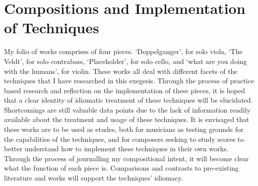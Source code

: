 

\chapter{Compositions and Implementation of Techniques}




My folio of works comprises of four pieces. `Doppelganger', for solo viola, `The Veldt', for solo contrabass, `Placeholder', for solo cello, and `what are you doing with the humans', for violin. 
These works all deal with different facets of the techniques that I have researched in this exegesis. 
Through the process of practice based research and reflection on the implementation of these pieces, it is hoped that a clear identity of idiomatic treatment of these techniques will be elucidated.
Shortcomings are still valuable data points due to the lack of information readily available about the treatment and usage of these techniques.
It is envisaged that these works are to be used as etudes, both for musicians as testing grounds for the capabilities of the techniques, and for composers seeking to study scores to better understand how to implement these techniques in their own works.
Through the process of journalling my compositional intent, it will become clear what the function of each piece is.
Comparisons and contrasts to pre-existing literature and works will support the techniques' idiomacy. 


